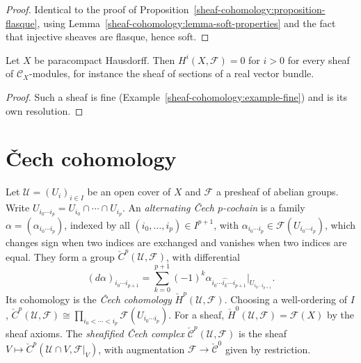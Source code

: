 \begin{proof}
Identical to the proof of Proposition~\ref{sheaf-cohomology:proposition-flasque}, using Lemma~\ref{sheaf-cohomology:lemma-soft-properties} and the fact that injective sheaves are
flasque, hence soft.
\end{proof}

\begin{corollary}\label{sheaf-cohomology:corollary-fine-acyclic}
Let $X$ be paracompact Hausdorff. Then $H^i(X, \mathcal{F}) = 0$ for $i > 0$ for every sheaf of $\mathcal{C}_X$-modules, for instance the sheaf of sections of a real vector bundle.
\end{corollary}

\begin{proof}
Such a sheaf is fine (Example~\ref{sheaf-cohomology:example-fine}) and is its own resolution.
\end{proof}

\section{\v{C}ech cohomology}\label{sheaf-cohomology:section-cech}

\begin{definition}\label{sheaf-cohomology:definition-cech}
Let $\mathcal{U} = (U_i)_{i \in I}$ be an open cover of $X$ and $\mathcal{F}$ a presheaf of abelian groups. Write $U_{i_0 \cdots i_p} = U_{i_0} \cap \cdots \cap U_{i_p}$. An \emph{alternating
\v{C}ech $p$-cochain} is a family $\alpha = (\alpha_{i_0 \cdots i_p})$, indexed by all $(i_0, \ldots, i_p) \in I^{p+1}$, with $\alpha_{i_0 \cdots i_p} \in \mathcal{F}(U_{i_0 \cdots i_p})$, which
changes sign when two indices are exchanged and vanishes when two indices are equal. They form a group $\check{C}^p(\mathcal{U}, \mathcal{F})$, with differential
\[
(d\alpha)_{i_0 \cdots i_{p+1}} = \sum_{k=0}^{p+1}(-1)^k\alpha_{i_0 \cdots \widehat{i_k} \cdots i_{p+1}}|_{U_{i_0 \cdots i_{p+1}}}.
\]
Its cohomology is the \emph{\v{C}ech cohomology} $\check{H}^p(\mathcal{U}, \mathcal{F})$. Choosing a well-ordering of $I$, $\check{C}^p(\mathcal{U}, \mathcal{F}) \cong \prod_{i_0 < \cdots < i_p}\mathcal{F}(U_{i_0 \cdots i_p})$.
For a sheaf, $\check{H}^0(\mathcal{U}, \mathcal{F}) = \mathcal{F}(X)$ by the sheaf axioms. The \emph{sheafified \v{C}ech complex} $\check{\mathcal{C}}^p(\mathcal{U}, \mathcal{F})$ is the sheaf
$V \mapsto \check{C}^p(\mathcal{U} \cap V, \mathcal{F}|_V)$, with augmentation $\mathcal{F} \to \check{\mathcal{C}}^0$ given by restriction.
\end{definition}

